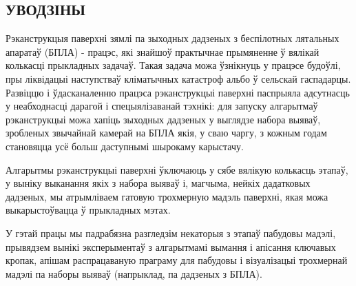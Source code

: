 \begin{center}
    \section*{УВОДЗІНЫ}
\end{center}

Рэканструкцыя паверхні зямлі па зыходных дадзеных з беспілотных лятальных апаратаў (БПЛА) - працэс,
які знайшоў практычнае прымяненне ў вялікай колькасці прыкладных задачаў. Такая задача можа ўзнікнуць
у працэсе будоўлі, пры ліквідацыі наступстваў кліматычных катастроф альбо ў сельскай гаспадарцы.
Развіццю і ўдасканаленню працэса рэканструкцыі паверхні паспрыяла адсутнасць у неабходнасці дарагой і
спецыялізаванай тэхнікі: для запуску алгарытмаў рэканструкцыі можа хапіць зыходных дадзеных у выглядзе
набора выяваў, зробленых звычайнай камерай на БПЛА якія, у сваю чаргу, з кожным годам становяцца
усё больш даступнымі шырокаму карыстачу.

Алгарытмы рэканструкцыі паверхні ўключаюць у сябе вялікую колькасць этапаў, у выніку выканання якіх
з набора выяваў і, магчыма, нейкіх дадатковых дадзеных, мы атрымліваем гатовую трохмерную мадэль паверхні,
якая можа выкарыстоўвацца ў прыкладных мэтах.

У гэтай працы мы падрабязна разгледзім некаторыя з этапаў пабудовы мадэлі, прывядзем вынікі эксперыментаў
з алгарытмамі вымання і апісання ключавых кропак, апішам распрацаваную праграму для пабудовы і візуалізацыі
трохмернай мадэлі па наборы выяваў (напрыклад, па дадзеных з БПЛА).

\newpage
